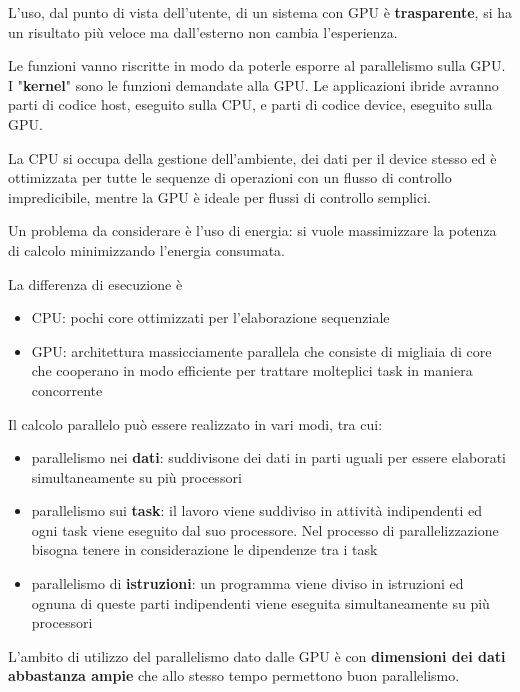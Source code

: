 L'uso, dal punto di vista dell'utente, di un sistema con GPU è \textbf{trasparente}, si ha un risultato più veloce ma dall'esterno non cambia l'esperienza.

Le funzioni vanno riscritte in modo da poterle esporre al parallelismo sulla GPU. I "\textbf{kernel}" sono le funzioni demandate alla GPU.  Le applicazioni ibride avranno parti di codice host, eseguito sulla CPU, e parti di codice device, eseguito sulla GPU. 

La CPU si occupa della gestione dell'ambiente, dei dati per il device stesso ed è ottimizzata per tutte le sequenze di operazioni con un flusso di controllo impredicibile, mentre la GPU è ideale per flussi di controllo semplici.

Un problema da considerare è l'uso di energia: si vuole massimizzare la potenza di calcolo minimizzando l'energia consumata.

La differenza di esecuzione è
\begin{itemize}
	\item CPU: pochi core ottimizzati per l'elaborazione sequenziale
	\item GPU: architettura massicciamente parallela che consiste di migliaia di core che cooperano in modo efficiente per trattare molteplici task in maniera concorrente
\end{itemize}

Il calcolo parallelo può essere realizzato in vari modi, tra cui: 
\begin{itemize}
	\item parallelismo nei \textbf{dati}: suddivisone dei dati in parti uguali per essere elaborati simultaneamente su più processori
	\item parallelismo sui \textbf{task}: il lavoro viene suddiviso in attività indipendenti ed ogni task viene eseguito dal suo processore. Nel processo di parallelizzazione bisogna tenere in considerazione le dipendenze tra i task
	\item parallelismo di \textbf{istruzioni}: un programma viene diviso in istruzioni ed ognuna di queste parti indipendenti viene eseguita simultaneamente su più processori
\end{itemize}
L'ambito di utilizzo del parallelismo dato dalle GPU è con \textbf{dimensioni dei dati abbastanza ampie} che allo stesso tempo permettono buon parallelismo.


